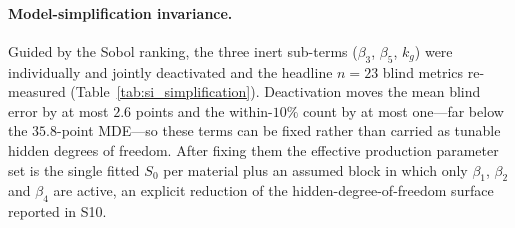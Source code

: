 \documentclass[12pt,a4paper,twocolumn]{article}
\begin{document}
\begin{table}[htbp]
\centering
\caption{$\beta_4$ sweep on the $n = 23$ paired blind set (per-material production value scaled by the factor).
Bootstrap $95\%$ CI of the paired mean difference includes zero at every level.}
\label{tab:si_beta4_sweep}
\footnotesize
{}
\end{table}

\paragraph{Model-simplification invariance.}
Guided by the Sobol ranking, the three inert sub-terms ($\beta_3$, $\beta_5$, $k_g$) were individually and
jointly deactivated and the headline $n = 23$ blind metrics re-measured (Table~\ref{tab:si_simplification}).
Deactivation moves the mean blind error by at most $2.6$ points and the within-$10\%$ count by at most one---far
below the $35.8$-point MDE---so these terms can be fixed rather than carried as tunable hidden degrees of freedom.
After fixing them the effective production parameter set is the single fitted $S_0$ per material plus an assumed
block in which only $\beta_1$, $\beta_2$ and $\beta_4$ are active, an explicit reduction of the
hidden-degree-of-freedom surface reported in S10.

\begin{table}[htbp]
\centering
\caption{Model-simplification invariance on the $n = 23$ paired blind set. $\Delta$ values are relative to the
full production model (mean $53.1\%$, median $34.7\%$, $5$ within $10\%$).}
\label{tab:si_simplification}
\footnotesize
{}
\end{table}
\end{document}
